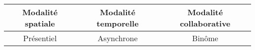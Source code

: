 \begin{seanceprof}

\end{seanceprof}

\begin{tabular}{|c|c|c|}
\hline 
Modalité spatiale & Modalité temporelle & Modalité collaborative \\ 
\hline 
Présentiel & Asynchrone & Binôme \\ 
\hline 
\end{tabular} 
